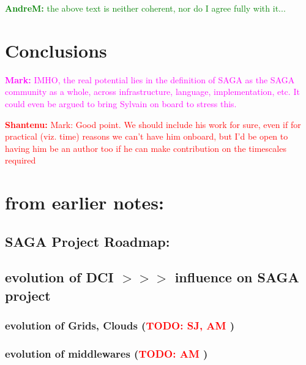 \documentclass[]{article}
\newcommand{\B}[1]{\textbf{#1}}
\newcommand{\todo}[1]{{\textcolor{red}{\B{TODO:} #1 }}}
\newcommand{\jhanote}[1]{{\textcolor{red}{     \B{Shantenu:} #1 }}}
\newcommand{\amnote}[1]{{\textcolor{green}{   \B{AndreM:  } #1 }}}
\newcommand{\msnote}[1]{{\textcolor{magenta}{ \B{Mark:    } #1 }}}
\newcommand{\jhanote}[1]{}
\newcommand{\amnote}[1]{}
\newcommand{\msnote}[1]{}
\begin{document}
  \amnote{the above text is neither coherent, nor do I agree fully with
  it...}


\section{Conclusions}

\msnote{IMHO, the real potential lies in the definition of SAGA as the
  SAGA community as a whole, across infrastructure, language,
  implementation, etc.  It could even be argued to bring Sylvain on
  board to stress this.}

\jhanote{Mark: Good point. We should include his work for sure, even
  if for practical (viz. time) reasons we can't have him onboard, but
  I'd be open to having him be an author too if he can make
  contribution on the timescales required}


\label{sec:sum}






\newpage

\section{\B{from earlier notes:}}


 \subsection{ SAGA Project Roadmap:}


 \subsection{ evolution of DCI $>>>$ influence on SAGA project}
 \subsubsection{ evolution of Grids, Clouds (\todo{SJ, AM})}
 \subsubsection{ evolution of middlewares (\todo{AM})}
\end{document}
